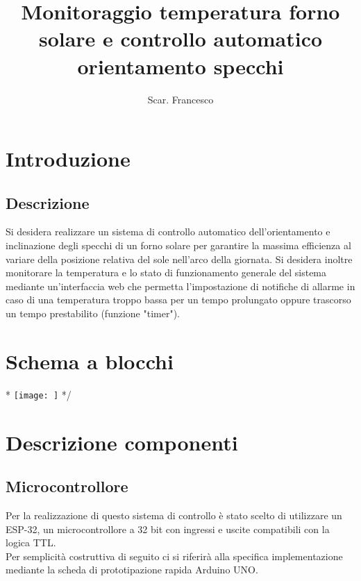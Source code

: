 \documentclass[12pt]{article}
\title{\textbf{Monitoraggio temperatura forno solare e controllo automatico orientamento specchi}}
\author{Scar. Francesco}
\date{}
\begin{document}
\maketitle

\tableofcontents{}

\newpage



\section{Introduzione}
    \subsection{Descrizione}
    Si desidera realizzare un sistema di controllo automatico dell'orientamento e inclinazione degli specchi di un forno solare per garantire la massima efficienza al variare della posizione relativa del sole nell'arco della giornata.
    Si desidera inoltre monitorare la temperatura e lo stato di funzionamento generale del sistema mediante un'interfaccia web che permetta l'impostazione di notifiche di allarme in caso di una temperatura troppo bassa per un tempo prolungato oppure trascorso un tempo prestabilito (funzione "timer").

\section{Schema a blocchi}

\/*
\noindent
\texttt{[image: ]}
*/


\vspace{0.5cm}
\noindent



\vfill



\section{Descrizione componenti}
    \subsection{Microcontrollore}
    Per la realizzazione di questo sistema di controllo è stato scelto di utilizzare un ESP-32, un microcontrollore a 32 bit con ingressi e uscite compatibili con la logica TTL.\\
    Per semplicità costruttiva di seguito ci si riferirà alla specifica implementazione me\-dian\-te la scheda di prototipazione rapida Arduino UNO.
\end{document}
